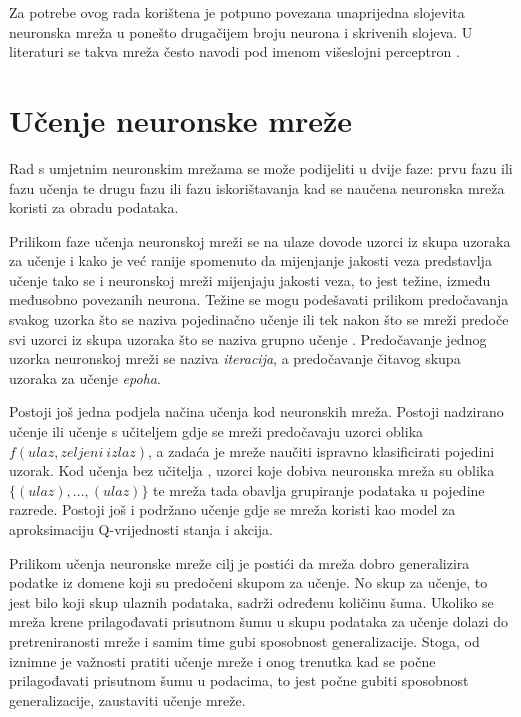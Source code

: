 Za potrebe ovog rada korištena je potpuno povezana unaprijedna slojevita neuronska mreža u ponešto drugačijem broju neurona i skrivenih slojeva. U literaturi se takva mreža često navodi pod imenom višeslojni perceptron .

\section{Učenje neuronske mreže}

Rad s umjetnim neuronskim mrežama se može podijeliti u dvije faze: prvu fazu ili fazu učenja  te drugu fazu ili fazu iskorištavanja kad se naučena neuronska mreža koristi za obradu podataka.

Prilikom faze učenja neuronskoj mreži se na ulaze dovode uzorci iz skupa uzoraka za učenje i kako je već ranije spomenuto da mijenjanje jakosti veza predstavlja učenje tako se i neuronskoj mreži mijenjaju jakosti veza, to jest težine, između međusobno povezanih neurona. Težine se mogu podešavati prilikom predočavanja svakog uzorka što se naziva pojedinačno učenje  ili tek nakon što se mreži predoče svi uzorci iz skupa uzoraka što se naziva grupno učenje . Predočavanje jednog uzorka neuronskoj mreži se naziva \emph{iteracija}, a predočavanje čitavog skupa uzoraka za učenje \emph{epoha}.

Postoji još jedna podjela načina učenja kod neuronskih mreža. Postoji nadzirano učenje  ili učenje s učiteljem gdje se mreži predočavaju uzorci oblika $f(ulaz, zeljeni\ izlaz)$, a zadaća je mreže naučiti ispravno klasificirati pojedini uzorak. Kod učenja bez učitelja , uzorci koje dobiva neuronska mreža su oblika $\{(ulaz), ...,(ulaz)\}$ te mreža tada obavlja grupiranje podataka u pojedine razrede. Postoji još i podržano učenje  gdje se mreža koristi kao model za aproksimaciju Q-vrijednosti stanja i akcija.

Prilikom učenja neuronske mreže cilj je postići da mreža dobro generalizira podatke iz domene koji su predočeni skupom za učenje. No skup za učenje, to jest bilo koji skup ulaznih podataka, sadrži određenu količinu šuma. Ukoliko se mreža krene prilagođavati prisutnom šumu u skupu podataka za učenje dolazi do pretreniranosti mreže i samim time gubi sposobnost generalizacije. Stoga, od iznimne je važnosti pratiti učenje mreže i onog trenutka kad se počne prilagođavati prisutnom šumu u podacima, to jest počne gubiti sposobnost generalizacije, zaustaviti učenje mreže.


